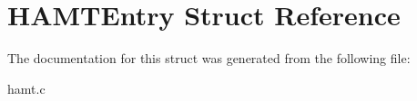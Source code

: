 \hypertarget{struct_h_a_m_t_entry}{\section{H\-A\-M\-T\-Entry Struct Reference}
\label{struct_h_a_m_t_entry}
}


The documentation for this struct was generated from the following file\-:\begin{DoxyCompactItemize}
\item 
hamt.\-c\end{DoxyCompactItemize}
